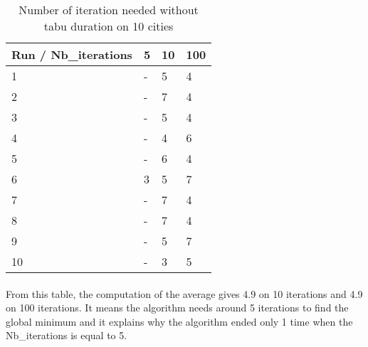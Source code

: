 \documentclass[12pt,oneside,a4paper]{article}
\begin{document}
\begin{table}[h]
    \centering
    \small
    \begin{tabular}{llll}
      \hline
      \multicolumn{1}{|l|}{\textbf{Run / Nb\_iterations}}& \multicolumn{1}{l|}{\textbf{5}} & \multicolumn{1}{l|}{\textbf{10}} & \multicolumn{1}{l|}{\textbf{100}}\\ \hline
      \multicolumn{1}{|l|}{1} & \multicolumn{1}{l|}{-}  & \multicolumn{1}{l|}{5}  & \multicolumn{1}{l|}{4}  \\ \hline
      \multicolumn{1}{|l|}{2} & \multicolumn{1}{l|}{-}  & \multicolumn{1}{l|}{7}  & \multicolumn{1}{l|}{4}  \\ \hline         
      \multicolumn{1}{|l|}{3} & \multicolumn{1}{l|}{-}  & \multicolumn{1}{l|}{5}  & \multicolumn{1}{l|}{4}  \\ \hline
      \multicolumn{1}{|l|}{4} & \multicolumn{1}{l|}{-}  & \multicolumn{1}{l|}{4}  & \multicolumn{1}{l|}{6}  \\ \hline
      \multicolumn{1}{|l|}{5} & \multicolumn{1}{l|}{-}  & \multicolumn{1}{l|}{6}  & \multicolumn{1}{l|}{4}  \\ \hline
      \multicolumn{1}{|l|}{6} & \multicolumn{1}{l|}{3}  & \multicolumn{1}{l|}{5}  & \multicolumn{1}{l|}{7}  \\ \hline
      \multicolumn{1}{|l|}{7} & \multicolumn{1}{l|}{-}  & \multicolumn{1}{l|}{7}  & \multicolumn{1}{l|}{4}  \\ \hline
      \multicolumn{1}{|l|}{8} & \multicolumn{1}{l|}{-}  & \multicolumn{1}{l|}{7}  & \multicolumn{1}{l|}{4}  \\ \hline
      \multicolumn{1}{|l|}{9} & \multicolumn{1}{l|}{-}  & \multicolumn{1}{l|}{5}  & \multicolumn{1}{l|}{7}  \\ \hline
      \multicolumn{1}{|l|}{10} & \multicolumn{1}{l|}{-}  & \multicolumn{1}{l|}{3}  & \multicolumn{1}{l|}{5}  \\ \hline
    \end{tabular}
    \caption{Number of iteration needed without tabu duration on 10 cities}
  \end{table}

\paragraph{}
    From this table, the computation of the average gives 4.9 on 10 iterations and 4.9 on 100 iterations.
    It means the algorithm needs around 5 iterations to find the global minimum and it explains why the algorithm
    ended only 1 time when the Nb\_iterations is equal to 5.
\end{document}
